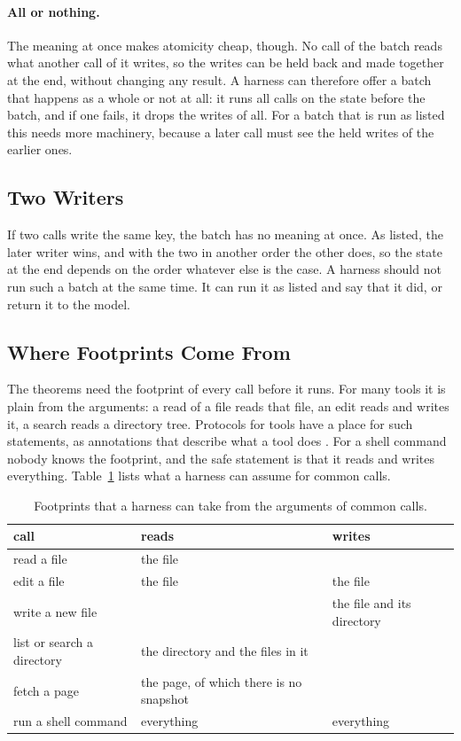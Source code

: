 \documentclass[acmsmall,nonacm,screen]{acmart}
\begin{document}
\paragraph{All or nothing.} The meaning at once makes atomicity cheap, though. No call of the
batch reads what another call of it writes, so the writes can be held back and made together
at the end, without changing any result. A harness can therefore offer a batch that happens
as a whole or not at all: it runs all calls on the state before the batch, and if one fails,
it drops the writes of all. For a batch that is run as listed this needs more machinery,
because a later call must see the held writes of the earlier ones.

\subsection{Two Writers}

If two calls write the same key, the batch has no meaning at once. As listed, the later
writer wins, and with the two in another order the other does, so the state at the end
depends on the order whatever else is the case. A harness should not run such a batch at the
same time. It can run it as listed and say that it did, or return it to the model.

\subsection{Where Footprints Come From}

The theorems need the footprint of every call before it runs. For many tools it is plain
from the arguments: a read of a file reads that file, an edit reads and writes it, a search
reads a directory tree. Protocols for tools have a place for such statements, as
annotations that describe what a tool does \citep{mcptools}. For a shell command nobody
knows the footprint, and the safe statement is that it reads and writes everything.
Table~\ref{tab:tools} lists what a harness can assume for common calls.

\begin{table}
\caption{Footprints that a harness can take from the arguments of common calls.}\label{tab:tools}
\begin{tabular}{lll}
\toprule
call & reads & writes \\
\midrule
read a file & the file & \\
edit a file & the file & the file \\
write a new file & & the file and its directory \\
list or search a directory & the directory and the files in it & \\
fetch a page & the page, of which there is no snapshot & \\
run a shell command & everything & everything \\
\bottomrule
\end{tabular}
\end{table}
\end{document}
